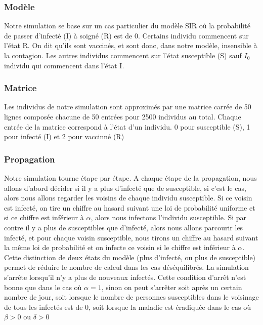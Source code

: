 \documentclass[10pt]{article}
\begin{document}
\subsubsection{Modèle}
Notre simulation se base sur un cas particulier du modèle SIR où la probabilité de passer d'infecté (I) à soigné (R) est de 0. Certains individu commencent sur l'état R. On dit qu'ils sont vaccinés, et sont donc, dans notre modèle, insensible à la contagion. Les autres individus commencent sur l'état susceptible (S) sauf $I_0$ individu qui commencent dans l'état I.
\subsubsection{Matrice}
Les individus de notre simulation sont approximés par une matrice carrée de 50 lignes composée chacune de 50 entrées pour 2500 individus au total. Chaque entrée de la matrice correspond à l'état d'un individu. 0 pour susceptible (S), 1 pour infecté (I) et 2 pour vaccinné (R)
\subsubsection{Propagation}
Notre simulation tourne étape par étape. A chaque étape de la propagation, nous allons d'abord décider si il y a plus d'infecté que de susceptible, si c'est le cas, alors nous allons regarder les voisins de chaque individu susceptible. Si ce voisin est infecté, on tire un chiffre au hasard suivant une loi de probabilité uniforme et si ce chiffre est inférieur à $\alpha$, alors nous infectons l'individu susceptible. Si par contre il y a plus de susceptibles que d'infecté, alors nous allons parcourir les infecté, et pour chaque voisin susceptible, nous tirons un chiffre au hasard suivant la même loi de probabilité et on infecte ce voisin si le chiffre est inférieur à $\alpha$. Cette distinction de deux états du modèle (plus d'infecté, ou plus de susceptible) permet de réduire le nombre de calcul dans les cas déséquilibrés.
La simulation s'arrête lorsqu'il n'y a plus de nouveaux infectés. Cette condition d'arrêt n'est bonne que dans le cas où $\alpha = 1$, sinon on peut s'arrêter soit après un certain nombre de jour, soit lorsque le nombre de personnes susceptibles dans le voisinage de tous les infectés est de 0, soit lorsque la maladie est éradiquée dans le cas où $\beta > 0$ ou $\delta > 0 $
\end{document}
